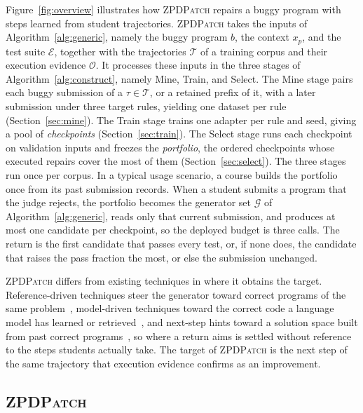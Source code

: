 \documentclass[10pt,conference]{IEEEtran}
\begin{document}
Figure~\ref{fig:overview} illustrates how \textsc{ZPDPatch} repairs a buggy program with steps learned from student trajectories. \textsc{ZPDPatch} takes the inputs of Algorithm~\ref{alg:generic}, namely the buggy program \(b\), the context \(x_p\), and the test suite \(\mathcal E\), together with the trajectories \(\mathcal T\) of a training corpus and their execution evidence \(\mathcal O\). It processes these inputs in the three stages of Algorithm~\ref{alg:construct}, namely Mine, Train, and Select. The Mine stage pairs each buggy submission of a \(\tau\in\mathcal T\), or a retained prefix of it, with a later submission under three target rules, yielding one dataset per rule (Section~\ref{sec:mine}). The Train stage trains one adapter per rule and seed, giving a pool of \emph{checkpoints} (Section~\ref{sec:train}). The Select stage runs each checkpoint on validation inputs and freezes the \emph{portfolio}, the ordered checkpoints whose executed repairs cover the most of them (Section~\ref{sec:select}). The three stages run once per corpus. In a typical usage scenario, a course builds the portfolio once from its past submission records. When a student submits a program that the judge rejects, the portfolio becomes the generator set \(\mathcal G\) of Algorithm~\ref{alg:generic}, reads only that current submission, and produces at most one candidate per checkpoint, so the deployed budget is three calls. The return is the first candidate that passes every test, or, if none does, the candidate that raises the pass fraction the most, or else the submission unchanged.

\textsc{ZPDPatch} differs from existing techniques in where it obtains the target. Reference-driven techniques steer the generator toward correct programs of the same problem~\cite{gulwani2018automated,wang2018search,hu2019re}, model-driven techniques toward the correct code a language model has learned or retrieved~\cite{zhang2024pydex,dai2026learner}, and next-step hints toward a solution space built from past correct programs~\cite{piech2015learning,rivers2017data,price2017isnap}, so where a return aims is settled without reference to the steps students actually take. The target of \textsc{ZPDPatch} is the next step of the same trajectory that execution evidence confirms as an improvement.

\subsection{\textup{\textsc{ZPDPatch}}}
\end{document}
